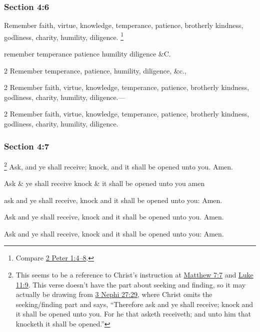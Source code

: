 	\subsubsection{Section 4:6} %
		\label{DC4-6}

		Remember faith, virtue, knowledge, temperance, patience, brotherly kindness, godliness, charity, humility, diligence.%
			\footnote{%
				Compare \hyperref[2PETER-1-4]{2 Peter 1:4--8}.
				}

		\begin{framed}
		\scriptsize
			\begin{compactdesc}
				\item[JSP] remember temperance patience humility diligence \&C.
				\item[RB1] [\textit{missing}]
				\item[BC] 2 Remember temperance, patience, humility, diligence, \&c.,
				\item[DC 1835] 2 Remember faith, virtue, knowledge, temperance, patience, brotherly kindness, godliness, charity, humility, diligence.---
				\item[DC 1844] 2 Remember faith, virtue, knowledge, temperance, patience, brotherly kindness, godliness, charity, humility, diligence.
			\end{compactdesc}
		\end{framed}

	\subsubsection{Section 4:7} %
		\label{DC4-7}

			\footnote{%
				This seems to be a reference to Christ's instruction at \hyperref[MATTHEW-7-7]{Matthew 7:7} and \hyperref[LUKE-11-9]{Luke 11:9}. This verse doesn't have the part about seeking and finding, so it may actually be drawing from \hyperref[3NEPHI-27-29]{3 Nephi 27:29}, where Christ omits the seeking/finding part and says, ``Therefore ask and ye shall receive; knock and it shall be opened unto you. For he that asketh receiveth; and unto him that knocketh it shall be opened.''
				}%
		Ask, and ye shall receive; knock, and it shall be opened unto you.  Amen.

		\begin{framed}
		\scriptsize
			\begin{compactdesc}
				\item[JSP] Ask \& ye shall receive knock \& it shall be opened unto you amen
				\item[RB1] [\textit{missing}]
				\item[BC] ask and ye shall receive, knock and it shall be opened unto you: Amen.
				\item[DC 1835] Ask and ye shall receive, knock and it shall be opened unto you. Amen.
				\item[DC 1844] Ask and ye shall receive, knock and it shall be opened unto you: Amen.
			\end{compactdesc}
		\end{framed}
